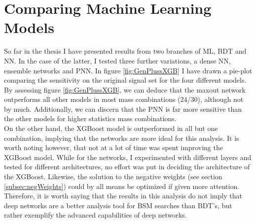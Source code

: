\section{Comparing Machine Learning Models}
So far in the thesis I have presented results from two branches of \ac{ML}, \acf{BDT} and \acf{NN}. In the case of the latter, I tested
three further variations, a dense \ac{NN}, ensemble networks and \ac{PNN}. In figure \ref{fig:GenPlussXGB} I have drawn a pie-plot comparing 
the sensitivity on the original signal set for the four different models. By assessing figure \ref{fig:GenPlussXGB}, we can deduce that the 
maxout network outperforms all other models in most mass combinations (24/30), although not by much. Additionally, we can discern that the \ac{PNN}
is far more sensitive than the other models for higher statistics mass combinations.
\\
On the other hand, the XGBoost model is outperformed in all but one combination, implying that the networks are more ideal for this analysis. 
It is worth noting however, that not at a lot of time was spent improving the XGBoost model. While for the networks, I experimented with different layers and 
tested for different architectures, no effort was put in deciding the architecture of the XGBoost. Likewise, the solution to the negative weights (see 
section \ref{subsec:negWeights}) could by all means be optimized if given more attention. Therefore, it is worth saying that the results in this analysis
do not imply that deep networks are a better analysis tool for \ac{BSM} searches than \ac{BDT}'s, but rather exemplify the advanced capabilities of deep networks.
